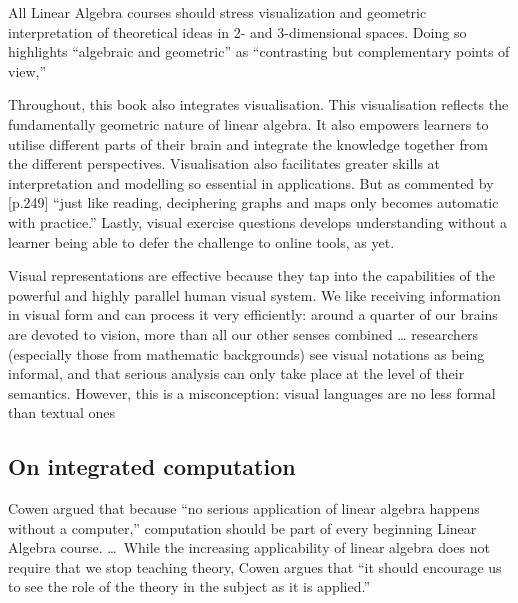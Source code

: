 \begin{quoted}{\cite[p.38]{CUPMguide2015}}
All Linear Algebra courses should stress visualization and geometric interpretation of theoretical ideas in 2- and 3-dimensional spaces. Doing so highlights ``algebraic and geometric'' as ``contrasting but complementary points of view,''
\end{quoted}


Throughout, this book also integrates visualisation.
This visualisation reflects the fundamentally geometric nature of linear algebra.  
It also empowers learners to utilise different parts of their brain and integrate the knowledge together from the different perspectives.
Visualisation also facilitates greater skills at interpretation and modelling so essential in applications.
But as commented by \cite{Fara2009} [p.249] ``just like reading, deciphering graphs and maps only becomes automatic with practice.''
Lastly, visual exercise questions develops understanding without a learner being able to defer the challenge to online tools, as yet.  

\begin{quoted}{\cite{Moody2009}}
Visual representations are effective because they tap into the capabilities of the powerful and highly parallel human visual system.
We like receiving information in visual form and can process it very efficiently: around a quarter of our brains are devoted to vision, more than all our other senses combined  \ldots
researchers (especially those from mathematic backgrounds) see visual notations as being informal, and that serious analysis can only take place at the level of their semantics. 
However, this is a misconception: visual languages are no less formal than textual ones
\end{quoted}









\subsection*{On integrated computation}

\begin{quoted}{\cite[p.38]{CUPMguide2015}}
Cowen argued that because ``no serious application of linear algebra happens without a computer,'' computation should be part of every beginning Linear Algebra course. \ldots\
While the increasing applicability of linear algebra does not require that we stop teaching theory, Cowen argues that ``it should encourage us to see the role of the theory in the subject as it is applied.''
\end{quoted}


